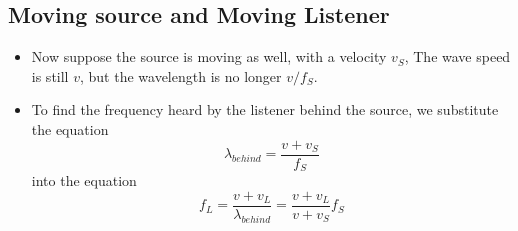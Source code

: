\documentclass[11pt, a4paper]{article}
\begin{document}
\subsection{Moving source and Moving Listener}
\begin{itemize}
    \item Now suppose the source is moving as well, with a velocity $v_S$, The wave speed
        is still $v$, but the wavelength is no longer $v / f_S$.
    \item To find the frequency heard by the listener behind the source, we substitute
        the equation
        \begin{equation}
            \lambda_{behind} = \frac{v + v_S}{f_S}
        \end{equation}
        into the equation
        \begin{equation}
            f_L = \frac{v+v_L}{\lambda_{behind}} = \frac{v+v_L}{v+v_S}f_S
        \end{equation}
\end{itemize}
\end{document}

